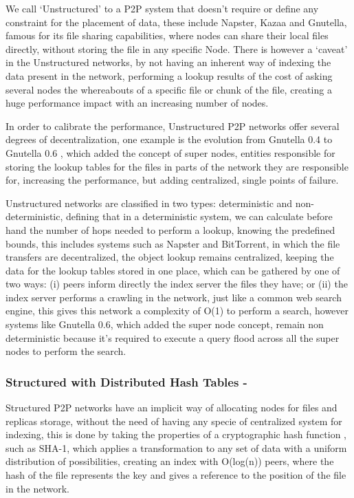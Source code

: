 We call `Unstructured' to a P2P system that doesn't require or define any constraint for the placement of data, these include Napster, Kazaa and Gnutella, famous for its file sharing capabilities, where nodes can share their local files directly, without storing the file in any specific Node. There is however a `caveat' in the Unstructured networks, by not having an inherent way of indexing the data present in the network, performing a lookup results of the cost of asking several nodes the whereabouts of a specific file or chunk of the file, creating a huge performance impact with an increasing number of nodes. 

In order to calibrate the performance, Unstructured P2P networks offer several degrees of decentralization, one example is the evolution from Gnutella 0.4\cite{Definition2003} to Gnutella 0.6 \cite{T.Klingberg2002}\cite{Ripeanu2002a}, which added the concept of super nodes, entities responsible for storing the lookup tables for the files in parts of the network they are responsible for, increasing the performance, but adding centralized, single points of failure. 

Unstructured networks are classified\cite{Ranjan2006} in two types: deterministic and non-deterministic, defining that in a deterministic system, we can calculate before hand the number of hops needed to perform a lookup, knowing the predefined bounds, this includes systems such as Napster and BitTorrent\cite{Cohen2009}, in which the file transfers are decentralized, the object lookup remains centralized, keeping the data for the lookup tables stored in one place, which can be gathered by one of two ways: (i) peers inform directly the index server the files they have; or (ii) the index server performs a crawling in the network, just like a common web search engine, this gives this network a complexity of O(1) to perform a search, however systems like Gnutella 0.6, which added the super node concept, remain non deterministic because it's required to execute a query flood across all the super nodes to perform the search.

\subsubsection{\textbf{Structured with Distributed Hash Tables -}}
\label{par:Structured with Distributed Hash Tables}

Structured P2P networks have an implicit way of allocating nodes for files and replicas storage, without the need of having any specie of centralized system for indexing, this is done by taking the properties of a cryptographic hash function \cite{Bakhtiari}\cite{Kargerl}\cite{Preneel1999}, such as SHA-1\cite{D.Eastlake3rdMotorola;P.JonesSystems2001}, which applies a transformation to any set of data with a uniform distribution of possibilities, creating an index with O(log(n)) peers, where the hash of the file represents the key and gives a reference to the position of the file in the network.

